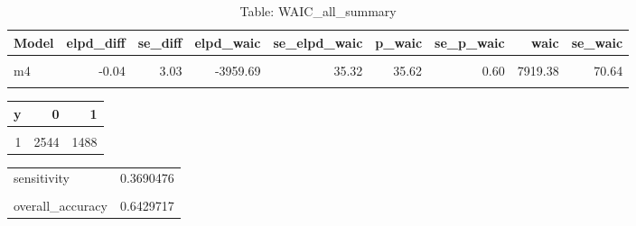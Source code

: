 \begin{table}
\centering
\caption{Table:  WAIC_all_summary}
\centering
\fontsize{10}{12}\selectfont
\begin{tabular}[t]{lrrrrrrrr}
\toprule
Model & elpd\_diff & se\_diff & elpd\_waic & se\_elpd\_waic & p\_waic & se\_p\_waic & waic & se\_waic\\
\midrule
\cellcolor{gray!10}{m3.1} & \cellcolor{gray!10}{0.00} & \cellcolor{gray!10}{0.00} & \cellcolor{gray!10}{-3959.65} & \cellcolor{gray!10}{35.29} & \cellcolor{gray!10}{31.07} & \cellcolor{gray!10}{0.50} & \cellcolor{gray!10}{7919.31} & \cellcolor{gray!10}{70.59}\\
m4 & -0.04 & 3.03 & -3959.69 & 35.32 & 35.62 & 0.60 & 7919.38 & 70.64\\
\cellcolor{gray!10}{m2} & \cellcolor{gray!10}{-0.05} & \cellcolor{gray!10}{0.12} & \cellcolor{gray!10}{-3959.70} & \cellcolor{gray!10}{35.28} & \cellcolor{gray!10}{31.11} & \cellcolor{gray!10}{0.51} & \cellcolor{gray!10}{7919.41} & \cellcolor{gray!10}{70.57}\\
\bottomrule
\end{tabular}
\end{table}

\begin{table}
\centering\caption{Table:  m2_postclass}
\begin{table}

\centering
\fontsize{10}{12}\selectfont
\begin{tabular}[t]{rrr}
\toprule
y & 0 & 1\\
\midrule
\cellcolor{gray!10}{0} & \cellcolor{gray!10}{3324} & \cellcolor{gray!10}{128}\\
1 & 2544 & 1488\\
\bottomrule
\end{tabular}
\end{table}\begin{table}

\centering
\begin{tabular}[t]{lr}
\toprule
\cellcolor{gray!10}{ } & \cellcolor{gray!10}{}\\
\midrule
sensitivity & 0.3690476\\
\cellcolor{gray!10}{specificity} & \cellcolor{gray!10}{0.9629200}\\
overall\_accuracy & 0.6429717\\
\bottomrule
\end{tabular}
\end{table}
\end{table}

